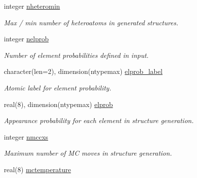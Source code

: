 \begin{DoxyCompactItemize}
integer \mbox{\hyperlink{namespaceglobaldata_a39c8b89979d9704364fd0a7f971af2d9}{nheteromin}}
\begin{DoxyCompactList}\small\item\em Max / min number of heteroatoms in generated structures. \end{DoxyCompactList}\item 
\mbox{\label{namespaceglobaldata_a20203d43856f2498ebe42db1c2e1e925}} 
integer \mbox{\hyperlink{namespaceglobaldata_a20203d43856f2498ebe42db1c2e1e925}{nelprob}}
\begin{DoxyCompactList}\small\item\em Number of element probabilities defined in input. \end{DoxyCompactList}\item 
\mbox{\label{namespaceglobaldata_ac02f16125b3c7d9fd1691b95809f6504}} 
character(len=2), dimension(ntypemax) \mbox{\hyperlink{namespaceglobaldata_ac02f16125b3c7d9fd1691b95809f6504}{elprob\+\_\+label}}
\begin{DoxyCompactList}\small\item\em Atomic label for element probability. \end{DoxyCompactList}\item 
\mbox{\label{namespaceglobaldata_aa3a9b2c367d447bc916e5f64e5e56d20}} 
real(8), dimension(ntypemax) \mbox{\hyperlink{namespaceglobaldata_aa3a9b2c367d447bc916e5f64e5e56d20}{elprob}}
\begin{DoxyCompactList}\small\item\em Appearance probability for each element in structure generation. \end{DoxyCompactList}\item 
\mbox{\label{namespaceglobaldata_ab1be7547fe40dc5e8a8905c6522dbf1d}} 
integer \mbox{\hyperlink{namespaceglobaldata_ab1be7547fe40dc5e8a8905c6522dbf1d}{nmccxs}}
\begin{DoxyCompactList}\small\item\em Maximum number of MC moves in structure generation. \end{DoxyCompactList}\item 
\mbox{\label{namespaceglobaldata_a92028cb3df1ec27c723ff4b98aa81710}} 
real(8) \mbox{\hyperlink{namespaceglobaldata_a92028cb3df1ec27c723ff4b98aa81710}{mctemperature}}

\end{DoxyCompactItemize}
